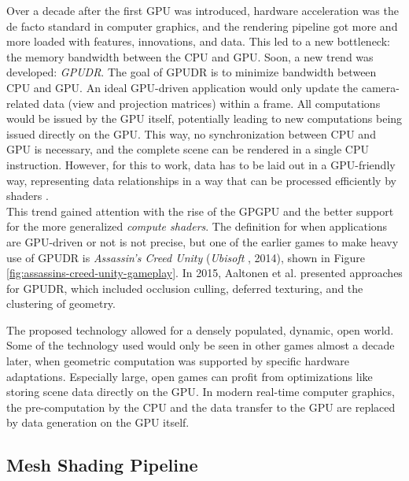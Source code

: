 \noindent
Over a decade after the first \ac{GPU} was introduced, hardware acceleration was the de facto standard in 
computer graphics, and the rendering pipeline got more and more loaded with features, innovations, and data. 
This led to a new bottleneck: the memory bandwidth between the \ac{CPU} and \ac{GPU}. Soon, a new trend was 
developed: \emph{\ac{GPUDR}}. The goal of \ac{GPUDR} is to minimize bandwidth between \ac{CPU} and \ac{GPU}. 
An ideal \ac{GPU}-driven application would only update the camera-related data (view and projection matrices) 
within a frame. All computations would be issued by the \ac{GPU} itself, potentially leading to new computations 
being issued directly on the \ac{GPU}. This way, no synchronization between \ac{CPU} and \ac{GPU} is necessary, 
and the complete scene can be rendered in a single \ac{CPU} instruction. However, for this to work, data has to 
be laid out in a \ac{GPU}-friendly way, representing data relationships in a way that can be processed 
efficiently by shaders \cite{VKGuide2020}. \\

\noindent
This trend gained attention with the rise of the \ac{GPGPU} and the better support for the more generalized 
\emph{compute shaders}. The definition for when applications are \ac{GPU}-driven or not is not precise, but 
one of the earlier games to make heavy use of \ac{GPUDR} is \emph{Assassin's Creed Unity} (\emph{Ubisoft} 
\cite{Ubisoft2014}, 2014), shown in Figure \ref{fig:assassins-creed-unity-gameplay}. In 2015, Aaltonen et al. 
\cite{Aaltonen2015} presented approaches for \ac{GPUDR}, which included occlusion culling, deferred texturing, 
and the clustering of geometry. \\

\clearpage

\noindent
The proposed technology allowed for a densely populated, dynamic, open world. 
Some of the technology used would only be seen in other games almost a decade later, when geometric computation 
was supported by specific hardware adaptations. Especially large, open games can profit from optimizations like 
storing scene data directly on the \ac{GPU}. In modern real-time computer graphics, the pre-computation by the 
\ac{CPU} and the data transfer to the \ac{GPU} are replaced by data generation on the \ac{GPU} itself.


\subsection*{Mesh Shading Pipeline} \label{subsec-mesh-shading-pipeline}

